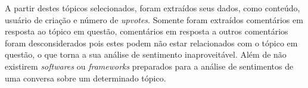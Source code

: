 A partir destes tópicos selecionados, foram extraídos seus dados, como conteúdo,
usuário de criação e número de \textit{upvotes}. Somente foram extraídos
comentários em resposta ao tópico em questão, comentários em resposta a outros
comentários foram desconsiderados pois estes podem não estar relacionados com o
tópico em questão, o que torna a sua análise de sentimento inaproveitável. Além
de não existirem \textit{softwares} ou \textit{frameworks} preparados para a
análise de sentimentos de uma conversa sobre um determinado tópico.
